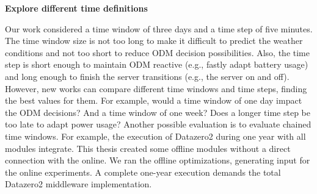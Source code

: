 \textbf{Explore different time definitions}

Our work considered a time window of three days and a time step of five minutes. The time window size is not too long to make it difficult to predict the weather conditions and not too short to reduce ODM decision possibilities. Also, the time step is short enough to maintain ODM reactive (e.g., fastly adapt battery usage) and long enough to finish the server transitions (e.g., the server on and off). However, new works can compare different time windows and time steps, finding the best values for them. For example, would a time window of one day impact the ODM decisions? And a time window of one week? Does a longer time step be too late to adapt power usage? Another possible evaluation is to evaluate chained time windows. For example, the execution of Datazero2 during one year with all modules integrate. This thesis created some offline modules without a direct connection with the online. We ran the offline optimizations, generating input for the online experiments. A complete one-year execution demands the total Datazero2 middleware implementation. 